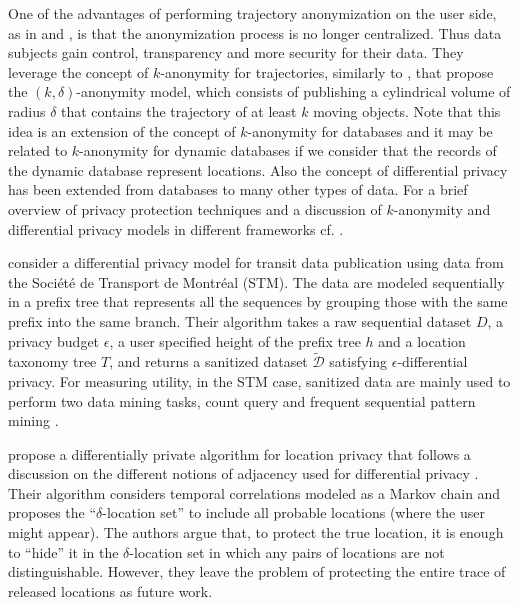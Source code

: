 \documentclass[times,twocolumn,final,authoryear]{elsarticle}
\begin{document}
One of the advantages of performing trajectory anonymization on the user side, as in \cite{Romero-Tris2016} and \cite{Romero-Tris:2018}, is that the anonymization process is no longer centralized. Thus data subjects gain control, transparency and more security for their data.
They leverage the concept of $k$-anonymity for trajectories, similarly to \cite{Abul2008}, that propose the $(k, \delta)$-anonymity model, which consists of publishing a cylindrical volume of radius $\delta$ that contains the trajectory of at least $k$ moving objects. 
Note that this idea is an extension of the concept of $k$-anonymity for databases \citep{Samarati:1998} and it may be related to $k$-anonymity for dynamic databases \citep{Salas:2018-b} if we consider that the records of the dynamic database represent locations.  
Also the concept of differential privacy \citep{Dwork:2006} has been extended from databases to many other types of data.
For a brief overview of privacy protection techniques and a discussion of $k$-anonymity and differential privacy models in different frameworks cf. \cite{Salas:2018}.


\cite{Chen:2012} consider a differential privacy model for transit data publication using data from the Soci\'{e}t\'{e} de Transport de Montr\'{e}al (STM). 
The data are modeled sequentially in a prefix tree that represents all the sequences by grouping those with the same prefix into the same branch.
Their algorithm takes a raw sequential dataset $D$, a privacy budget $\epsilon$, a user specified height of the prefix tree $h$ and a location taxonomy tree $T$, and returns a sanitized dataset $\tilde{\mathcal{D}}$ satisfying $\epsilon$-differential privacy.
For measuring utility, in the STM case, sanitized data are mainly used to perform two
data mining tasks, count query and frequent sequential pattern mining \citep{Agrawal:1995}.


\cite{Xiao:2015} propose a differentially private algorithm for location privacy that follows a discussion on the different notions of adjacency used for  differential privacy \citep[for e.g.]{Chatzik:2013,Kifer:2011}.
Their algorithm considers temporal correlations modeled as a Markov chain and proposes the ``$\delta$-location set'' to include all probable locations (where the user might appear). The authors argue that, to protect the true location, it is enough to “hide” it in the $\delta$-location set in which any pairs of locations are not distinguishable.
However, they leave the problem of protecting the entire trace of released locations as future work.
\end{document}
